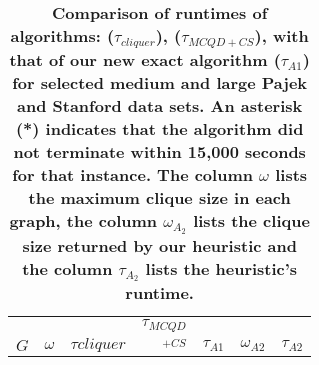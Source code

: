 \begin{table}[tbh]
\centering
\caption{{\bf Comparison of runtimes of algorithms: \cite{ostergard} ({\it $\tau_{cliquer}$}), \cite{konc2007improved} ({\it $\tau_{MCQD+CS}$}), 
with that of our new exact algorithm ($\tau_{A1}$) for selected medium and large Pajek and Stanford data sets. 
An asterisk (*) indicates that the algorithm did not terminate within 
15,000 seconds for that instance. The column $\omega$ lists the maximum clique size in each graph, 
the column $\omega_{A_2}$ lists the clique size returned by our heuristic and the column
$\tau_{A_2}$ lists the heuristic's runtime.}}
\label{tab:pajek_stanford}
\begin{tabular}{lr|rrr|rr}
\toprule\toprule
	&		&			&	$\tau_{MCQD}$	&		&		&		\\
$G$	&	$\omega$	&	$\tau{cliquer}$	&	$_{+CS}$	&	$\tau_{A1}$	&	$\omega_{A2}$	&	$\tau_{A2}$	\\ \hline \hline

\end{tabular}
\end{table}
